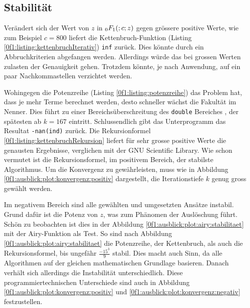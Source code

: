 \subsection{Stabilität
\label{0f1:subsection:Stabilitaet}}
Verändert sich der Wert von $z$ in $\mathstrut_0F_1(;c;z)$ gegen grössere positive Werte, wie zum Beispiel $c = 800$ liefert die Kettenbruch-Funktion (Listing \ref{0f1:listing:kettenbruchIterativ}) \verb+inf+ zurück. Dies könnte durch ein Abbruchkriterien abgefangen werden. Allerdings würde das bei grossen Werten zulasten der Genauigkeit gehen. Trotzdem könnte, je nach Anwendung, auf ein paar Nachkommastellen verzichtet werden.

Wohingegen die Potenzreihe (Listing \ref{0f1:listing:potenzreihe}) das Problem hat, dass je mehr Terme berechnet werden, desto schneller wächst die Fakultät im Nenner. Dies führt zu einer Bereichsüberschreitung des \verb+double+ Bereiches \cite{0f1:double}, der spätesten ab $k=167$ eintritt. Schlussendlich gibt das Unterprogramm das Resultat \verb+-nan(ind)+ zurück.
Die Rekursionformel \eqref{0f1:listing:kettenbruchRekursion} liefert für sehr grosse positive Werte die genausten Ergebnisse, verglichen mit der GNU Scientific Library. Wie schon vermutet ist die Rekursionsformel, im positivem Bereich, der stabilste Algorithmus. Um die Konvergenz zu gewährleisten, muss wie in Abbildung \ref{0f1:ausblick:plot:konvergenz:positiv} dargestellt, die Iterationstiefe $k$ genug gross gewählt werden.

Im negativem Bereich sind alle gewählten und umgesetzten Ansätze instabil. Grund dafür ist die Potenz von $z$, was zum Phänomen der Auslöschung \cite{0f1:SeminarNumerik} führt. Schön zu beobachten ist dies in der Abbildung \ref{0f1:ausblick:plot:airy:stabilitaet} mit der Airy-Funktion als Test. So sind nach Abbildung \ref{0f1:ausblick:plot:airy:stabilitaet} die Potenzreihe, der Kettenbruch, als auch die Rekursionsformel, bis ungefähr $\frac{-15^3}{9}$ stabil. Dies macht auch Sinn, da alle Algorithmen auf der gleichen mathematischen Grundlage basieren. Danach verhält sich allerdings die Instabilität unterschiedlich. Diese programmiertechnischen Unterschiede sind auch in Abbildung \ref{0f1:ausblick:plot:konvergenz:positiv} und \ref{0f1:ausblick:plot:konvergenz:negativ} festzustellen.

